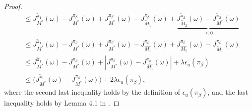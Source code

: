 \begin{proof}
\begin{align}
    &\le J^{\widetilde{\pi}_1}_{M^*}(\omega) - J^{\pi_\beta}_{M^*}(\omega) + {J^{\pi_\beta}_{M^*}(\omega) - J^{{\pi}_\beta}_{\widetilde{M}_1}(\omega)} + \underbrace{J^{\widetilde{\pi}_2}_{\widetilde{M}_2}(\omega) - J^{\widetilde{\pi}_2}_{M^*}(\omega)}_{\leq 0} \\
    &\le J^{\widetilde{\pi}_1}_{M^*}(\omega) - J^{\pi_\beta}_{M^*}(\omega) + J^{\pi_\beta}_{M^*}(\omega) - J^{{\pi}_\beta}_{\widehat{M_1}}(\omega) + J^{{\pi}_\beta}_{\widehat{M_1}}(\omega) - J^{{\pi}_\beta}_{\widetilde{M}_1}(\omega) \\
    &\le J^{\widetilde{\pi}_1}_{M^*}(\omega) - J^{\pi_\beta}_{M^*}(\omega) + \left| J^{\pi_\beta}_{M^*}(\omega) - J^{{\pi}_\beta}_{\widehat{M_1}}(\omega) \right| +\lambda \epsilon_u (\pi_\beta) \\
    &\le \Big( J^{\widetilde{\pi}_1}_{M^*}(\omega)-J^{\pi_\beta}_{M^*}(\omega) \Big) + 2 \lambda \epsilon_u (\pi_\beta),
\end{align}
where the second last inequality holds by the definition of $\epsilon_u(\pi_\beta)$, and the last inequality holds by Lemma 4.1 in \citep{yu2020mopo}.


\end{proof}
